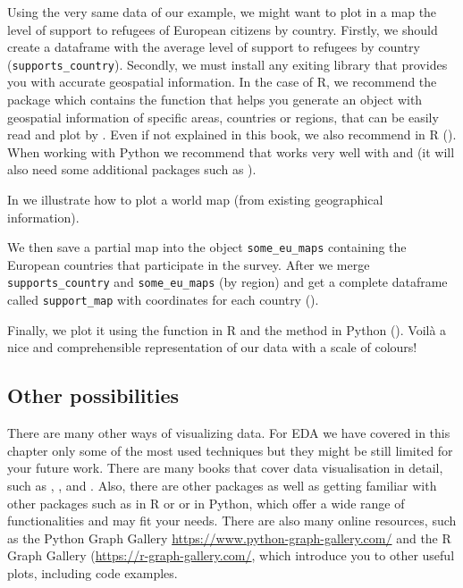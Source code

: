 Using the very same data of our example, we might want to plot in a map the level of support to refugees of European citizens by country. Firstly, we should create a dataframe with the average level of support to refugees by country (\texttt{supports\_country}). Secondly, we must install any exiting library that provides you with accurate geospatial information. In the case of R, we recommend the package  which contains the function  that helps you generate an object with geospatial information of specific areas, countries or regions, that can be easily read and plot by . Even if not explained in this book, we also recommend  in R (\cite{kahle2013ggmap}). When working with Python we recommend  that works very well with  and  (it will also need some additional packages such as ).  

In  we illustrate how to plot a world map (from existing geographical information).


We then save a partial map into the object \texttt{some\_eu\_maps} containing the European countries that participate in the survey. After we merge \texttt{supports\_country} and \texttt{some\_eu\_maps} (by region) and get a complete dataframe called \texttt{support\_map} with coordinates for each country ().  


Finally, we plot it using the  function  in R and the  method  in Python (). Voilà a nice and comprehensible representation of our data with a scale of colours!



\subsection{Other possibilities}

There are many other ways of visualizing data. For EDA we have covered in this chapter only some of the most used techniques but they might be still limited for your future work. There are many books that cover data visualisation in detail, such as \cite{tufte2006beautiful}, \cite{cairo2019charts}, and \cite{Kirk2012}. Also, there are other packages as well as getting familiar with other packages such as  in R or  or  in Python, which offer a wide range of functionalities and may fit your needs. There are also many online resources, such as the Python Graph Gallery \url{https://www.python-graph-gallery.com/} and the R Graph Gallery (\url{https://r-graph-gallery.com/}, which introduce you to other useful plots, including code examples.
